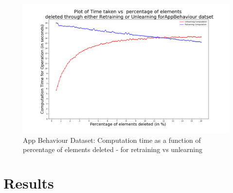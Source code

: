 \documentclass[11pt,letterpaper]{article}
\begin{document}
\begin{figure}[h!]
    \centering
    \includegraphics[width=6.5 in ]{tables/PlotUnlearningVsRetrainingAppBehaviour.png}
    \caption{App Behaviour Dataset: Computation time as a function of percentage of elements deleted - for retraining vs unlearning}
    \label{fig:graph-appbehaviour}
\end{figure}
\FloatBarrier

\section{Results}
\end{document}
